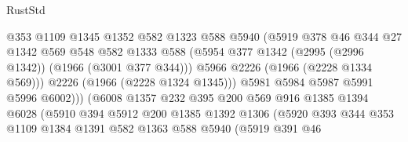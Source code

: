 \begin{lexlean}{RustStd}
\begin{coremodule}
                                  @353
                                  @1109
                                  @1345
                                  @1352
                                  @582
                                  @1323
                                  @588
                                  @5940
                                  (@5919
                                    @378
                                    @46
                                    @344
                                    @27
                                    @1342
                                    @569
                                    @548
                                    @582
                                    @1333
                                    @588
                                    (@5954
                                      @377
                                      @1342
                                      (@2995 (@2996 @1342))
                                      (@1966 (@3001 @377 @344)))
                                    @5966
                                    @2226
                                    (@1966 (@2228 @1334 @569)))
                                  @2226
                                  (@1966 (@2228 @1324 @1345)))
                                @5981
                                @5984
                                @5987
                                @5991
                                @5996
                                @6002)))
                          (@6008
                            @1357
                            @232
                            @395
                            @200
                            @569
                            @916
                            @1385
                            @1394
                            @6028
                            (@5910
                              @394
                              @5912
                              @200
                              @1385
                              @1392
                              @1306
                              (@5920
                                @393
                                @344
                                @353
                                @1109
                                @1384
                                @1391
                                @582
                                @1363
                                @588
                                @5940
                                (@5919
                                  @391
                                  @46

\end{coremodule}
\end{lexlean}
